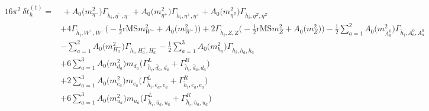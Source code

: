 \begin{align} 
16\pi^2 \ \delta t^{(1)}_{h} = & \, +{A_0\Big(m^2_{\eta^-}\Big)} {\Gamma_{\check{h}_{{i}},\bar{\eta^-},\eta^-}} +{A_0\Big(m^2_{\eta^+}\Big)} {\Gamma_{\check{h}_{{i}},\bar{\eta^+},\eta^+}} +{A_0\Big(m^2_{\eta^Z}\Big)} {\Gamma_{\check{h}_{{i}},\bar{\eta^Z},\eta^Z}} \nonumber \\ 
 &+4 {\Gamma_{\check{h}_{{i}},W^+,W^-}} \Big(-\frac{1}{2} \text{rMS} m^2_{W^-}  + {A_0\Big(m^2_{W^-}\Big)}\Big)+2 {\Gamma_{\check{h}_{{i}},Z,Z}} \Big(-\frac{1}{2} \text{rMS} m^2_{Z}  + {A_0\Big(m^2_{Z}\Big)}\Big)-\frac{1}{2} \sum_{a=1}^{2}{A_0\Big(m^2_{A^0_{{a}}}\Big)} {\Gamma_{\check{h}_{{i}},A^0_{{a}},A^0_{{a}}}}  \nonumber \\ 
 &- \sum_{a=1}^{2}{A_0\Big(m^2_{H^-_{{a}}}\Big)} {\Gamma_{\check{h}_{{i}},H^+_{{a}},H^-_{{a}}}}  -\frac{1}{2} \sum_{a=1}^{3}{A_0\Big(m^2_{h_{{a}}}\Big)} {\Gamma_{\check{h}_{{i}},h_{{a}},h_{{a}}}}  \nonumber \\ 
 &+6 \sum_{a=1}^{3}{A_0\Big(m^2_{d_{{a}}}\Big)} m_{d_{{a}}} \Big({\Gamma^L_{\check{h}_{{i}},\bar{d}_{{a}},d_{{a}}}} + {\Gamma^R_{\check{h}_{{i}},\bar{d}_{{a}},d_{{a}}}}\Big) \nonumber \\ 
 &+2 \sum_{a=1}^{3}{A_0\Big(m^2_{e_{{a}}}\Big)} m_{e_{{a}}} \Big({\Gamma^L_{\check{h}_{{i}},\bar{e}_{{a}},e_{{a}}}} + {\Gamma^R_{\check{h}_{{i}},\bar{e}_{{a}},e_{{a}}}}\Big) \nonumber \\ 
 &+6 \sum_{a=1}^{3}{A_0\Big(m^2_{u_{{a}}}\Big)} m_{u_{{a}}} \Big({\Gamma^L_{\check{h}_{{i}},\bar{u}_{{a}},u_{{a}}}} + {\Gamma^R_{\check{h}_{{i}},\bar{u}_{{a}},u_{{a}}}}\Big)  
\end{align} 
